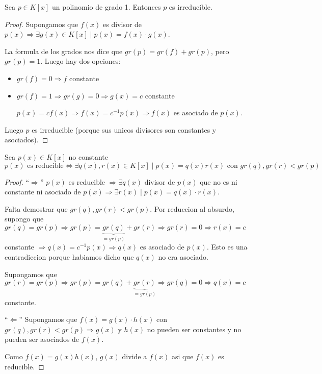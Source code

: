 \begin{proposition}
	Sea \(p \in K[x ]\) un polinomio de grado 1. Entonces \(p \) es irreducible.
\end{proposition}
\begin{proof}
	Supongamos que \(f(x )\) es divisor de \(p(x) \Rightarrow \exists g(x) \in K[x ] \mid p(x) = f(x) \cdot g(x)\).
	
	La formula de los grados nos dice que \(gr(p) = gr(f) + gr(p)\), pero \(gr(p) = 1\). Luego hay dos opciones:
	\begin{itemize}
		\item \(gr(f) = 0 \Rightarrow f \) constante
		\item \(gr(f) = 1 \Rightarrow gr(g) = 0 \Rightarrow g(x) = c \) constante
		      
		      \(p(x) = c f(x) \Rightarrow f(x) = c^{-1} p(x )\Rightarrow f(x )\) es asociado de \(p(x )\).
	\end{itemize}
	Luego \(p \) es irreducible (porque sus unicos divisores son constantes y asociados).
	
\end{proof}
\begin{proposition}
	Sea \(p(x) \in K[x ]\) no constante
	\[
		p(x) \text{ es reducible} \iff \exists q(x), r(x) \in K[x] \mid p(x) = q(x) r(x) \text{ con } gr(q), gr(r) < gr(p)
	\]
\end{proposition}
\begin{proof}
	``\(\Rightarrow \)'' \(p(x )\) es reducible \(\Rightarrow \exists q(x) \) divisor de \(p(x )\) que no es ni constante ni asociado de \(p(x ) \Rightarrow \exists r(x) \mid p (x) = q(x) \cdot r(x) \).
	
	Falta demostrar que \(gr(q), gr(r) < gr(p)\). Por reduccion al absurdo, supongo que \(gr(q) = gr(p) \Rightarrow gr(p) =\underbrace{ gr(q)}_{= gr(p)} + gr(r) \Rightarrow gr(r) = 0 \Rightarrow r(x) = c  \) constante \(\Rightarrow q(x) = c^{-1} p(x) \Rightarrow q(x) \) es asociado de \(p(x )\). Esto es una contradiccion porque habiamos dicho que \(q(x )\) no era asociado.
	
	Supongamos que \(gr(r) = gr(p )\Rightarrow gr(p) = gr(q) + \underbrace{gr(r)}_{= gr(p )} \Rightarrow gr(q) = 0 \Rightarrow q(x) = c \) constante.
	
	``\(\Leftarrow \)'' Supongamos que \(f(x) = g(x) \cdot h(x) \) con \(gr(q), gr(r) < gr(p) \Rightarrow g(x)\) y \(h(x)\) no pueden ser constantes y no pueden ser asociados de \(f(x )\).
	
	Como \(f(x) = g(x) h(x )\), \(g(x )\) divide a \(f(x )\) asi que \(f(x )\) es reducible.
\end{proof}

